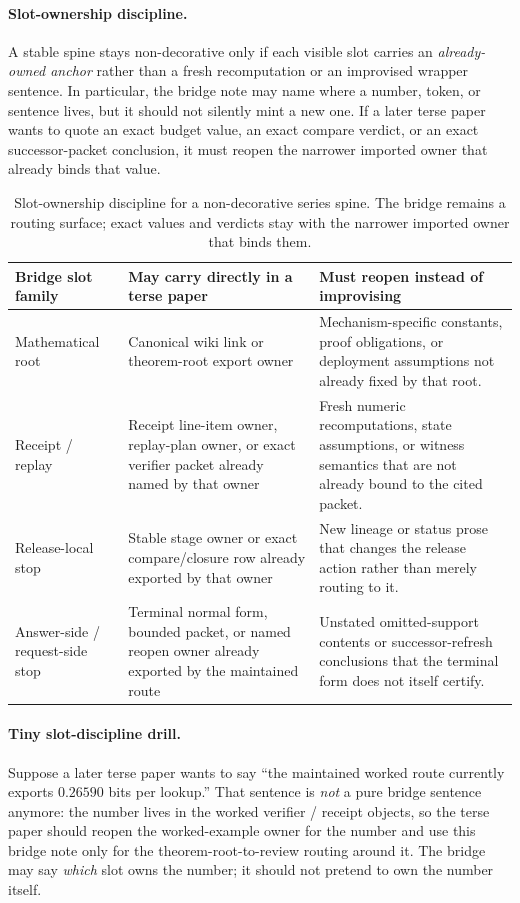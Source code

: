 \documentclass[11pt]{article}
\begin{document}
\paragraph{Slot-ownership discipline.}
A stable spine stays non-decorative only if each visible slot carries an \emph{already-owned anchor} rather than a fresh recomputation or an improvised wrapper sentence. In particular, the bridge note may name where a number, token, or sentence lives, but it should not silently mint a new one. If a later terse paper wants to quote an exact budget value, an exact compare verdict, or an exact successor-packet conclusion, it must reopen the narrower imported owner that already binds that value.\cite{series:receiptitems,series:auditorreplay,series:releasespine,series:workedexample}

\begin{table}[t]
\centering
\small
\begin{tabularx}{\linewidth}{@{}L Y Y@{}}
\toprule
Bridge slot family & May carry directly in a terse paper & Must reopen instead of improvising \\
\midrule
Mathematical root & Canonical wiki link or theorem-root export owner & Mechanism-specific constants, proof obligations, or deployment assumptions not already fixed by that root. \\
Receipt / replay & Receipt line-item owner, replay-plan owner, or exact verifier packet already named by that owner & Fresh numeric recomputations, state assumptions, or witness semantics that are not already bound to the cited packet. \\
Release-local stop & Stable stage owner or exact compare/closure row already exported by that owner & New lineage or status prose that changes the release action rather than merely routing to it. \\
Answer-side / request-side stop & Terminal normal form, bounded packet, or named reopen owner already exported by the maintained route & Unstated omitted-support contents or successor-refresh conclusions that the terminal form does not itself certify. \\
\bottomrule
\end{tabularx}
\caption{Slot-ownership discipline for a non-decorative series spine. The bridge remains a routing surface; exact values and verdicts stay with the narrower imported owner that binds them.}
\label{tab:seriesspine-slot-ownership}
\end{table}

\paragraph{Tiny slot-discipline drill.}
Suppose a later terse paper wants to say ``the maintained worked route currently exports $0.26590$ bits per lookup.'' That sentence is \emph{not} a pure bridge sentence anymore: the number lives in the worked verifier / receipt objects, so the terse paper should reopen the worked-example owner for the number and use this bridge note only for the theorem-root-to-review routing around it. The bridge may say \emph{which} slot owns the number; it should not pretend to own the number itself.\cite{series:workedexample}
\end{document}
